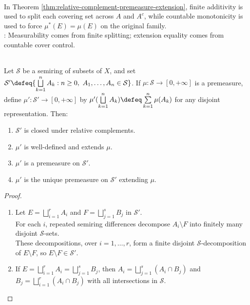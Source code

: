 \begin{remark} \label{rem:premeasure-roles-in-caratheodory-hahn} \\
In Theorem \ref{thm:relative-complement-premeasure-extension}, finite additivity is used to split each covering set across $A$ and $A^c$, while countable monotonicity is used to force $\mu^\ast(E)=\mu(E)$ on the original family.\\
: Measurability comes from finite splitting; extension equality comes from countable cover control.
\end{remark}

\begin{proposition} \label{prop:semiring-premeasure-finite-union-extension} \\
Let $\mathcal{S}$ be a semiring of subsets of $X$, and set $\mathcal{S}'\defeq\{\bigsqcup\limits_{k=1}^{n}A_k:n\geq0,\ A_1,\ldots,A_n\in\mathcal{S}\}$. If $\mu:\mathcal{S}\to[0,+\infty]$ is a premeasure, define $\mu':\mathcal{S}'\to[0,+\infty]$ by $\mu'(\bigsqcup\limits_{k=1}^{n}A_k)\defeq\sum\limits_{k=1}^{n}\mu(A_k)$ for any disjoint representation. Then:
\begin{enumerate}[label=(\roman*)]
\setlength{\itemsep}{0pt}
\item $\mathcal{S}'$ is closed under relative complements.
\item $\mu'$ is well-defined and extends $\mu$.
\item $\mu'$ is a premeasure on $\mathcal{S}'$.
\item $\mu'$ is the unique premeasure on $\mathcal{S}'$ extending $\mu$.
\end{enumerate}
\begin{proof}
\begin{enumerate}[label=(\roman*)]
\setlength{\itemsep}{0pt}
\item Let $E=\bigsqcup\limits_{i=1}^{r}A_i$ and $F=\bigsqcup\limits_{j=1}^{s}B_j$ in $\mathcal{S}'$.\\
For each $i$, repeated semiring differences decompose $A_i\setminus F$ into finitely many disjoint $\mathcal{S}$-sets.\\
These decompositions, over $i=1,\ldots,r$, form a finite disjoint $\mathcal{S}$-decomposition of $E\setminus F$, so $E\setminus F\in\mathcal{S}'$.
\item If $E=\bigsqcup\limits_{i=1}^{r}A_i=\bigsqcup\limits_{j=1}^{s}B_j$, then $A_i=\bigsqcup\limits_{j=1}^{s}(A_i\cap B_j)$ and $B_j=\bigsqcup\limits_{i=1}^{r}(A_i\cap B_j)$ with all intersections in $\mathcal{S}$.\\

\end{enumerate}
\end{proof}
\end{proposition}
